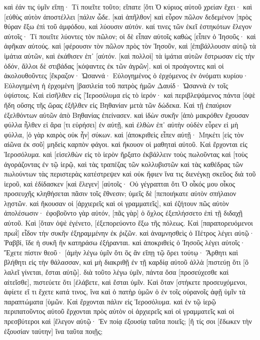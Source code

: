 καὶ ἐάν τις ὑμῖν εἴπῃ· Τί ποιεῖτε τοῦτο; εἴπατε [ὅτι Ὁ κύριος αὐτοῦ χρείαν ἔχει· καὶ [εὐθὺς αὐτὸν ἀποστέλλει [πάλιν ὧδε. 
[καὶ ἀπῆλθον] καὶ εὗρον πῶλον δεδεμένον [πρὸς θύραν ἔξω ἐπὶ τοῦ ἀμφόδου, καὶ λύουσιν αὐτόν. 
καί τινες τῶν ἐκεῖ ἑστηκότων ἔλεγον αὐτοῖς· Τί ποιεῖτε λύοντες τὸν πῶλον; 
οἱ δὲ εἶπαν αὐτοῖς καθὼς [εἶπεν ὁ Ἰησοῦς· καὶ ἀφῆκαν αὐτούς. 
καὶ [φέρουσιν τὸν πῶλον πρὸς τὸν Ἰησοῦν, καὶ [ἐπιβάλλουσιν αὐτῷ τὰ ἱμάτια αὐτῶν, καὶ ἐκάθισεν ἐπ᾽ [αὐτόν. 
[καὶ πολλοὶ] τὰ ἱμάτια αὐτῶν ἔστρωσαν εἰς τὴν ὁδόν, ἄλλοι δὲ στιβάδας [κόψαντες ἐκ τῶν ἀγρῶν]. 
καὶ οἱ προάγοντες καὶ οἱ ἀκολουθοῦντες [ἔκραζον· Ὡσαννά· Εὐλογημένος ὁ ἐρχόμενος ἐν ὀνόματι κυρίου· 
Εὐλογημένη ἡ ἐρχομένη [βασιλεία τοῦ πατρὸς ἡμῶν Δαυίδ· Ὡσαννὰ ἐν τοῖς ὑψίστοις. 
Καὶ εἰσῆλθεν εἰς [Ἱεροσόλυμα εἰς τὸ ἱερόν· καὶ περιβλεψάμενος πάντα [ὀψὲ ἤδη οὔσης τῆς ὥρας ἐξῆλθεν εἰς Βηθανίαν μετὰ τῶν δώδεκα. 
Καὶ τῇ ἐπαύριον ἐξελθόντων αὐτῶν ἀπὸ Βηθανίας ἐπείνασεν. 
καὶ ἰδὼν συκῆν [ἀπὸ μακρόθεν ἔχουσαν φύλλα ἦλθεν εἰ ἄρα [τι εὑρήσει] ἐν αὐτῇ, καὶ ἐλθὼν ἐπ᾽ αὐτὴν οὐδὲν εὗρεν εἰ μὴ φύλλα, [ὁ γὰρ καιρὸς οὐκ ἦν] σύκων. 
καὶ [ἀποκριθεὶς εἶπεν αὐτῇ· Μηκέτι [εἰς τὸν αἰῶνα ἐκ σοῦ] μηδεὶς καρπὸν φάγοι. καὶ ἤκουον οἱ μαθηταὶ αὐτοῦ. 
Καὶ ἔρχονται εἰς Ἱεροσόλυμα. καὶ [εἰσελθὼν εἰς τὸ ἱερὸν ἤρξατο ἐκβάλλειν τοὺς πωλοῦντας καὶ [τοὺς ἀγοράζοντας ἐν τῷ ἱερῷ, καὶ τὰς τραπέζας τῶν κολλυβιστῶν καὶ τὰς καθέδρας τῶν πωλούντων τὰς περιστερὰς κατέστρεψεν 
καὶ οὐκ ἤφιεν ἵνα τις διενέγκῃ σκεῦος διὰ τοῦ ἱεροῦ, 
καὶ ἐδίδασκεν [καὶ ἔλεγεν] [αὐτοῖς· Οὐ γέγραπται ὅτι Ὁ οἶκός μου οἶκος προσευχῆς κληθήσεται πᾶσιν τοῖς ἔθνεσιν; ὑμεῖς δὲ [πεποιήκατε αὐτὸν σπήλαιον λῃστῶν. 
καὶ ἤκουσαν οἱ [ἀρχιερεῖς καὶ οἱ γραμματεῖς], καὶ ἐζήτουν πῶς αὐτὸν ἀπολέσωσιν· ἐφοβοῦντο γὰρ αὐτόν, [πᾶς γὰρ] ὁ ὄχλος ἐξεπλήσσετο ἐπὶ τῇ διδαχῇ αὐτοῦ. 
Καὶ [ὅταν ὀψὲ ἐγένετο, [ἐξεπορεύοντο ἔξω τῆς πόλεως. 
Καὶ [παραπορευόμενοι πρωῒ] εἶδον τὴν συκῆν ἐξηραμμένην ἐκ ῥιζῶν. 
καὶ ἀναμνησθεὶς ὁ Πέτρος λέγει αὐτῷ· Ῥαββί, ἴδε ἡ συκῆ ἣν κατηράσω ἐξήρανται. 
καὶ ἀποκριθεὶς ὁ Ἰησοῦς λέγει αὐτοῖς· Ἔχετε πίστιν θεοῦ· 
[ἀμὴν λέγω ὑμῖν ὅτι ὃς ἂν εἴπῃ τῷ ὄρει τούτῳ· Ἄρθητι καὶ βλήθητι εἰς τὴν θάλασσαν, καὶ μὴ διακριθῇ ἐν τῇ καρδίᾳ αὐτοῦ ἀλλὰ [πιστεύῃ ὅτι [ὃ λαλεῖ γίνεται, ἔσται αὐτῷ]. 
διὰ τοῦτο λέγω ὑμῖν, πάντα ὅσα [προσεύχεσθε καὶ αἰτεῖσθε], πιστεύετε ὅτι [ἐλάβετε, καὶ ἔσται ὑμῖν. 
Καὶ ὅταν [στήκετε προσευχόμενοι, ἀφίετε εἴ τι ἔχετε κατά τινος, ἵνα καὶ ὁ πατὴρ ὑμῶν ὁ ἐν τοῖς οὐρανοῖς ἀφῇ ὑμῖν τὰ παραπτώματα [ὑμῶν. 
Καὶ ἔρχονται πάλιν εἰς Ἱεροσόλυμα. καὶ ἐν τῷ ἱερῷ περιπατοῦντος αὐτοῦ ἔρχονται πρὸς αὐτὸν οἱ ἀρχιερεῖς καὶ οἱ γραμματεῖς καὶ οἱ πρεσβύτεροι 
καὶ [ἔλεγον αὐτῷ· Ἐν ποίᾳ ἐξουσίᾳ ταῦτα ποιεῖς; [ἢ τίς σοι [ἔδωκεν τὴν ἐξουσίαν ταύτην] ἵνα ταῦτα ποιῇς; 
